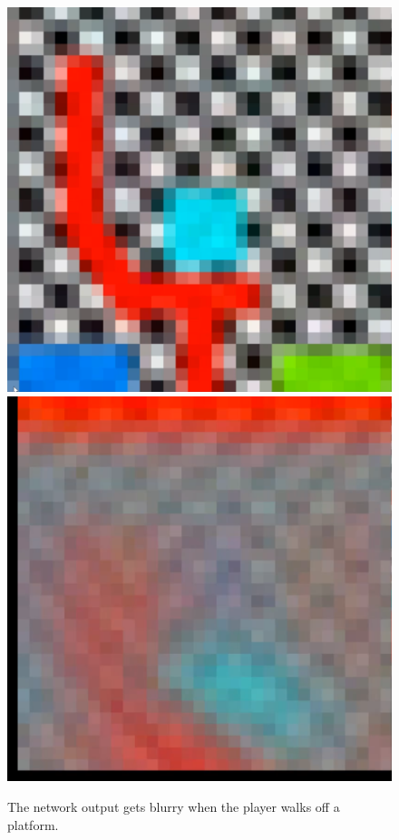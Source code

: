 \begin{figure}[p]
  \centering
  \includegraphics[width=\imgWidth]{images/workflow/TopDownOn.png} \\[\picVdist]
  \includegraphics[width=\imgWidth]{images/workflow/TopDownOff.png}
  \caption{The network output gets blurry when the player walks off a platform.}
  \label{WalkOffPlatform}
\end{figure}


